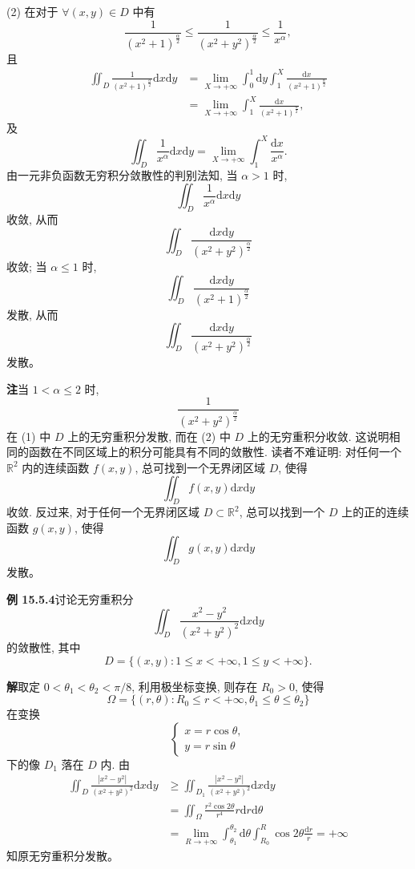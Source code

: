 \documentclass[UTF8,12pt,a4paper,fontset=fandol]{ctexart}
\begin{document}
(2) 在对于 $\forall(x,y)\in D$ 中有
\[
  \frac1{(x^2+1)^{\frac\alpha2}}\leqslant
  \frac1{(x^2+y^2)^{\frac\alpha2}}\leqslant\frac1{x^\alpha},
\]
且
\[
\begin{aligned}
  \iint_D\frac1{(x^2+1)^{\frac\alpha2}}\mathrm dx\mathrm dy
  &=\lim_{X\to+\infty}\int_0^1\mathrm dy\int_1^X
  \frac{\mathrm dx}{(x^2+1)^{\frac\alpha2}}\\
  &=\lim_{X\to+\infty}\int_1^X
  \frac{\mathrm dx}{(x^2+1)^{\frac\alpha2}},
\end{aligned}
\]
及
\[
  \iint_D\frac1{x^\alpha}\mathrm dx\mathrm dy
  =\lim_{X\to+\infty}\int_1^X\frac{\mathrm dx}{x^\alpha}.
\]
由一元非负函数无穷积分敛散性的判别法知, 当 $\alpha>1$ 时,
\[
  \iint_D\frac1{x^\alpha}\mathrm dx\mathrm dy
\]
收敛, 从而
\[
  \iint_D\frac{\mathrm dx\mathrm dy}{(x^2+y^2)^{\frac\alpha2}}
\]
收敛; 当 $\alpha\leqslant1$ 时,
\[
  \iint_D\frac{\mathrm dx\mathrm dy}{(x^2+1)^{\frac\alpha2}}
\]
发散, 从而
\[
  \iint_D\frac{\mathrm dx\mathrm dy}{(x^2+y^2)^{\frac\alpha2}}
\]
发散。

\noindent\textbf{注}\quad 当 $1<\alpha\leqslant2$ 时,
\[
  \frac1{(x^2+y^2)^{\frac\alpha2}}
\]
在 (1) 中 $D$ 上的无穷重积分发散, 而在 (2) 中 $D$ 上的无穷重积分收敛. 这说明相同的函数在不同区域上的积分可能具有不同的敛散性. 读者不难证明: 对任何一个 $\mathbb R^2$ 内的连续函数 $f(x,y)$, 总可找到一个无界闭区域 $D$, 使得
\[
  \iint_D f(x,y)\mathrm dx\mathrm dy
\]
收敛. 反过来, 对于任何一个无界闭区域 $D\subset\mathbb R^2$, 总可以找到一个 $D$ 上的正的连续函数 $g(x,y)$, 使得
\[
  \iint_D g(x,y)\mathrm dx\mathrm dy
\]
发散。

\noindent\textbf{例 15.5.4}\quad 讨论无穷重积分
\[
  \iint_D\frac{x^2-y^2}{(x^2+y^2)^2}\mathrm dx\mathrm dy
\]
的敛散性, 其中
\[
  D=\{(x,y):1\leqslant x<+\infty,1\leqslant y<+\infty\}.
\]

\noindent\textbf{解}\quad 取定 $0<\theta_1<\theta_2<\pi/8$, 利用极坐标变换, 则存在 $R_0>0$, 使得
\[
  \Omega=\{(r,\theta):R_0\leqslant r<+\infty,\theta_1\leqslant\theta\leqslant\theta_2\}
\]
在变换
\[
  \begin{cases}
    x=r\cos\theta,\\
    y=r\sin\theta
  \end{cases}
\]
下的像 $D_1$ 落在 $D$ 内. 由
\[
\begin{aligned}
  \iint_D\frac{|x^2-y^2|}{(x^2+y^2)^2}\mathrm dx\mathrm dy
  &\geqslant\iint_{D_1}\frac{|x^2-y^2|}{(x^2+y^2)^2}\mathrm dx\mathrm dy\\
  &=\iint_\Omega\frac{r^2\cos2\theta}{r^4}r\mathrm dr\mathrm d\theta\\
  &=\lim_{R\to+\infty}\int_{\theta_1}^{\theta_2}\mathrm d\theta
  \int_{R_0}^R\cos2\theta\frac{\mathrm dr}r=+\infty
\end{aligned}
\]
知原无穷重积分发散。
\end{document}
